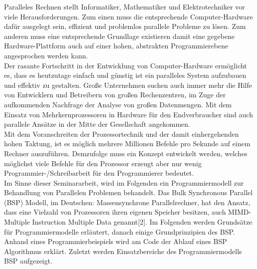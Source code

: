 \documentclass[a4paper,10pt]{scrartcl}
\begin{document}
Paralleles Rechnen stellt Informatiker, Mathematiker und Elektrotechniker vor viele Herausforderungen. Zum einen muss die entsprechende Computer-Hardware dafür ausgelegt sein, effizient und problemlos parallele Probleme zu lösen. Zum anderen muss eine entsprechende Grundlage existieren damit eine gegebene Hardware-Plattform auch auf einer hohen, abstrakten Programmierebene angesprochen werden kann.\\
Der rasante Fortschritt in der Entwicklung von Computer-Hardware ermöglicht es, dass es heutzutage einfach und günstig ist ein paralleles System aufzubauen und effektiv zu gestalten. Große Unternehmen suchen auch immer mehr die Hilfe von Entwicklern und Betreibern von großen Rechenzentren, im Zuge der aufkommenden Nachfrage der Analyse von großen Datenmengen. Mit dem Einsatz von Mehrkernprozessoren in Hardware für den Endverbraucher sind auch parallele Ansätze in der Mitte der Gesellschaft angekommen.\\ Mit dem Voranschreiten der Prozessortechnik und der damit einhergehenden hohen Taktung, ist es möglich mehrere Millionen Befehle pro Sekunde auf einem Rechner auszuführen. Demzufolge muss ein Konzept entwickelt werden, welches möglichst viele Befehle für den Prozessor erzeugt aber nur wenig Programmier-/Schreibarbeit für den Programmierer bedeutet.\\
Im Sinne dieser Seminararbeit, wird im Folgenden ein Programmiermodell zur Behandlung von Parallelen Problemen behandelt. Das Bulk Synchronous Parallel (BSP) Modell, im Deutschen: Massensynchrone Parallelrechner, hat den Ansatz, dass eine Vielzahl von Prozessoren ihren eigenen Speicher besitzen, auch MIMD-Multiple Instruction Multiple Data genannt[2]. Im Folgenden werden Grundsätze für Programmiermodelle erläutert, danach einige Grundprinzipien des BSP. Anhand eines Programmierbeispiels wird am Code der Ablauf eines BSP Algorithmus erklärt. Zuletzt werden Einsatzbereiche des Programmiermodells BSP aufgezeigt.  
\end{document}
